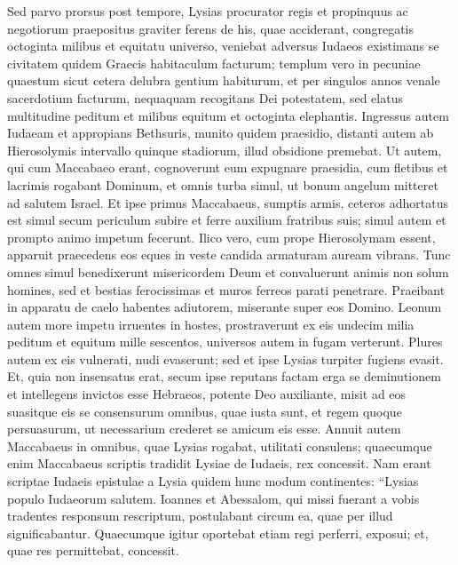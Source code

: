 \begin{biblechapter}  
\verse Sed parvo prorsus post tempore, Lysias procurator regis et propinquus ac negotiorum praepositus graviter ferens de his, quae acciderant, 
\verse congregatis octoginta milibus et equitatu universo, veniebat adversus Iudaeos existimans se civitatem quidem Graecis habitaculum facturum; 
\verse templum vero in pecuniae quaestum sicut cetera delubra gentium habiturum, et per singulos annos venale sacerdotium facturum, 
\verse nequaquam recogitans Dei potestatem, sed elatus multitudine peditum et milibus equitum et octoginta elephantis. 
\verse Ingressus autem Iudaeam et appropians Bethsuris, munito quidem praesidio, distanti autem ab Hierosolymis intervallo quinque stadiorum, illud obsidione premebat. 
\verse Ut autem, qui cum Maccabaeo erant, cognoverunt eum expugnare praesidia, cum fletibus et lacrimis rogabant Dominum, et omnis turba simul, ut bonum angelum mitteret ad salutem Israel. 
\verse Et ipse primus Maccabaeus, sumptis armis, ceteros adhortatus est simul secum periculum subire et ferre auxilium fratribus suis; simul autem et prompto animo impetum fecerunt. 
\verse Ilico vero, cum prope Hierosolymam essent, apparuit praecedens eos eques in veste candida armaturam auream vibrans. 
\verse Tunc omnes simul benedixerunt misericordem Deum et convaluerunt animis non solum homines, sed et bestias ferocissimas et muros ferreos parati penetrare. 
\verse Praeibant in apparatu de caelo habentes adiutorem, miserante super eos Domino. 
\verse Leonum autem more impetu irruentes in hostes, prostraverunt ex eis undecim milia peditum et equitum mille sescentos, universos autem in fugam verterunt. 
\verse Plures autem ex eis vulnerati, nudi evaserunt; sed et ipse Lysias turpiter fugiens evasit. 
\verse Et, quia non insensatus erat, secum ipse reputans factam erga se deminutionem et intellegens invictos esse Hebraeos, potente Deo auxiliante, misit ad eos  
\verse suasitque eis se consensurum omnibus, quae iusta sunt, et regem quoque persuasurum, ut necessarium crederet se amicum eis esse. 
\verse Annuit autem Maccabaeus in omnibus, quae Lysias rogabat, utilitati consulens; quaecumque enim Maccabaeus scriptis tradidit Lysiae de Iudaeis, rex concessit. 
\verse Nam erant scriptae Iudaeis epistulae a Lysia quidem hunc modum continentes: “Lysias populo Iudaeorum salutem. 
\verse Ioannes et Abessalom, qui missi fuerant a vobis tradentes responsum rescriptum, postulabant circum ea, quae per illud significabantur. 
\verse Quaecumque igitur oportebat etiam regi perferri, exposui; et, quae res permittebat, concessit. 

\end{biblechapter}
